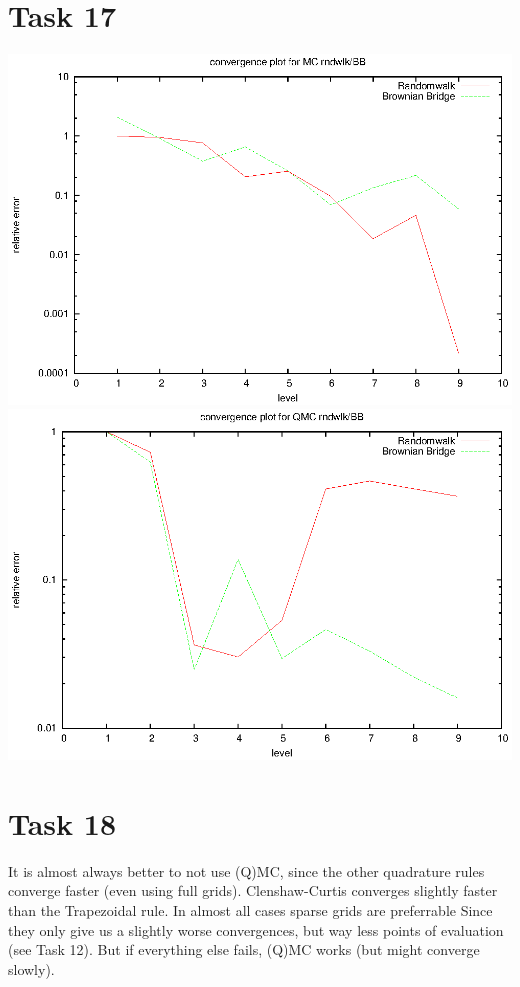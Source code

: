 \documentclass[]{article}
\begin{document}
\section*{Task 17}
\includegraphics{task17_mc}\\
\includegraphics{task17_qmc}\\

\section*{Task 18} It is almost always better to not use (Q)MC, since the other
quadrature rules converge faster (even using full grids). Clenshaw-Curtis
converges slightly faster than the Trapezoidal rule. In almost all cases sparse
grids are preferrable Since they only give us a slightly worse convergences, but
way less points of evaluation (see Task 12). But if everything else fails, (Q)MC
works (but might converge slowly).
\end{document}

